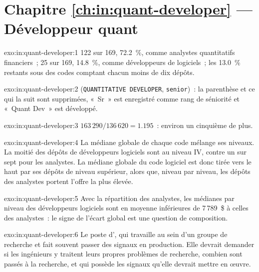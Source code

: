\section*{Chapitre \ref{ch:in:quant-developer} --- Développeur quant}

\begin{solution}{exo:in:quant-developer:1}
122 sur 169, 72.2~\%, comme analystes quantitatifs financiers~; 25 sur 169, 14.8~\%, comme développeurs de logiciels~; les 13.0~\% restants sous
des codes comptant chacun moins de dix dépôts.
\end{solution}

\begin{solution}{exo:in:quant-developer:2}
(\texttt{QUANTITATIVE DEVELOPER}, \texttt{senior})~: la parenthèse et ce qui la suit sont supprimées, «~Sr~» est enregistré comme
rang de séniorité et «~Quant Dev~» est développé.
\end{solution}

\begin{solution}{exo:in:quant-developer:3}
$163\,290/136\,620=1.195$~: environ un cinquième de plus.
\end{solution}

\begin{solution}{exo:in:quant-developer:4}
La médiane globale de chaque code mélange ses niveaux. La moitié des dépôts de développeurs logiciels sont au niveau IV, contre un sur
sept pour les analystes. La médiane globale du code logiciel est donc tirée vers le haut par ses dépôts de niveau supérieur, alors que, niveau
par niveau, les dépôts des analystes portent l'offre la plus élevée.
\end{solution}

\begin{solution}{exo:in:quant-developer:5}
Avec la répartition des analystes, les médianes par niveau des développeurs logiciels sont en moyenne inférieures de 7\,789~\$ à celles des analystes~: le signe de
l'écart global est une question de composition.
\end{solution}

\begin{solution}{exo:in:quant-developer:6}
Le poste d', qui travaille au sein d'un groupe de recherche et fait souvent passer des signaux en production.
Elle devrait demander si les ingénieurs y traitent leurs propres problèmes de recherche, combien sont passés à la recherche,
et qui possède les signaux qu'elle devrait mettre en œuvre.
\end{solution}

